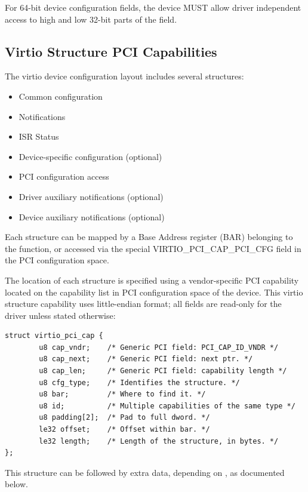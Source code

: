 For 64-bit device configuration fields, the device MUST allow driver
independent access to high and low 32-bit parts of the field.

\subsection{Virtio Structure PCI Capabilities}\label{sec:Virtio Transport Options / Virtio Over PCI Bus / Virtio Structure PCI Capabilities}

The virtio device configuration layout includes several structures:
\begin{itemize}
\item Common configuration
\item Notifications
\item ISR Status
\item Device-specific configuration (optional)
\item PCI configuration access
\item Driver auxiliary notifications (optional)
\item Device auxiliary notifications (optional)
\end{itemize}

Each structure can be mapped by a Base Address register (BAR) belonging to
the function, or accessed via the special VIRTIO_PCI_CAP_PCI_CFG field in the PCI configuration space.

The location of each structure is specified using a vendor-specific PCI capability located
on the capability list in PCI configuration space of the device.
This virtio structure capability uses little-endian format; all fields are
read-only for the driver unless stated otherwise:

\begin{lstlisting}
struct virtio_pci_cap {
        u8 cap_vndr;    /* Generic PCI field: PCI_CAP_ID_VNDR */
        u8 cap_next;    /* Generic PCI field: next ptr. */
        u8 cap_len;     /* Generic PCI field: capability length */
        u8 cfg_type;    /* Identifies the structure. */
        u8 bar;         /* Where to find it. */
        u8 id;          /* Multiple capabilities of the same type */
        u8 padding[2];  /* Pad to full dword. */
        le32 offset;    /* Offset within bar. */
        le32 length;    /* Length of the structure, in bytes. */
};
\end{lstlisting}

This structure can be followed by extra data, depending on
, as documented below.

